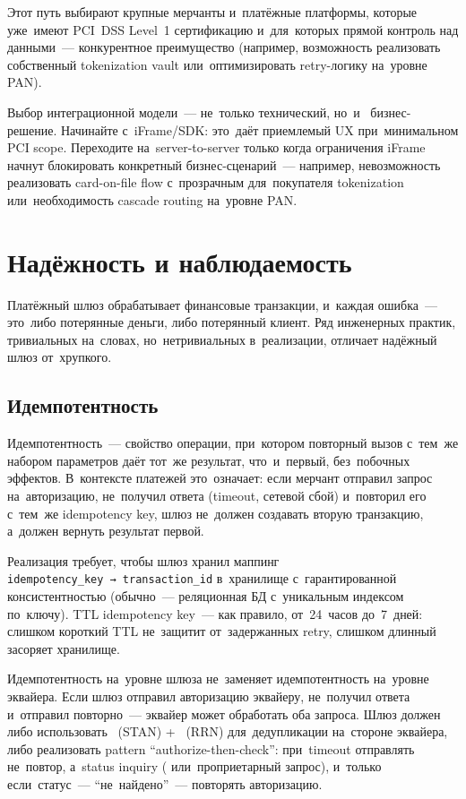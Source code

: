 Этот путь выбирают крупные мерчанты и~платёжные платформы,
которые уже~имеют PCI~DSS Level~1 сертификацию и~для~которых
прямой контроль над данными~--- конкурентное преимущество
(например, возможность реализовать собственный tokenization vault
или~оптимизировать retry-логику на~уровне PAN).

\begin{practice}
  Выбор интеграционной модели~--- не~только технический, но~и~
  бизнес-решение. Начинайте с~iFrame/SDK: это~даёт приемлемый UX
  при~минимальном PCI scope. Переходите на~server-to-server
  только когда ограничения iFrame начнут блокировать конкретный
  бизнес-сценарий~--- например, невозможность реализовать
  card-on-file flow с~прозрачным для~покупателя tokenization
  или~необходимость cascade routing на~уровне PAN.
\end{practice}


\section{Надёжность и наблюдаемость}
\label{sec:gw-reliability}

Платёжный шлюз обрабатывает финансовые транзакции, и~каждая ошибка~---
это~либо потерянные деньги, либо потерянный клиент. Ряд инженерных
практик, тривиальных на~словах, но~нетривиальных в~реализации,
отличает надёжный шлюз от~хрупкого.

\subsection*{Идемпотентность}

Идемпотентность~--- свойство операции, при~котором повторный вызов
с~тем~же набором параметров даёт тот~же результат, что~и~первый,
без~побочных эффектов. В~контексте платежей это~означает:
если мерчант отправил запрос на~авторизацию, не~получил ответа
(timeout, сетевой сбой) и~повторил его с~тем~же idempotency key,
шлюз не~должен создавать вторую транзакцию, а~должен вернуть
результат первой.

Реализация требует, чтобы шлюз хранил маппинг
\texttt{idempotency\_key~→~transaction\_id} в~хранилище
с~гарантированной консистентностью (обычно~--- реляционная БД
с~уникальным индексом по~ключу). TTL idempotency key~--- как правило,
от~24~часов до~7~дней: слишком короткий TTL не~защитит от~задержанных
retry, слишком длинный засоряет хранилище.

\begin{important}
  Идемпотентность на~уровне шлюза не~заменяет идемпотентность
  на~уровне эквайера. Если шлюз отправил авторизацию эквайеру,
  не~получил ответа и~отправил повторно~--- эквайер может
  обработать оба запроса. Шлюз должен либо использовать
  ~(STAN) + ~(RRN) для~дедупликации
  на~стороне эквайера, либо реализовать pattern
  \enquote{authorize-then-check}: при~timeout отправлять не~повтор,
  а~status inquiry ( или~проприетарный запрос),
  и~только если~статус~--- \enquote{не~найдено}~--- повторять
  авторизацию.
\end{important}

